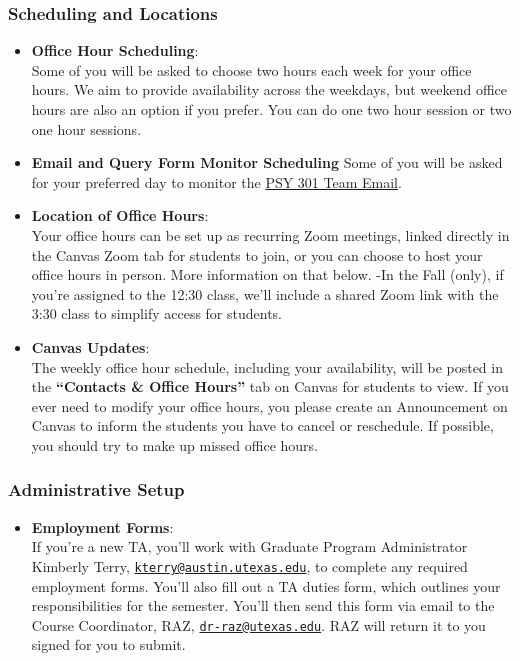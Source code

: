 \documentclass[
]{article}
\providecommand{\tightlist}{%
  \setlength{\itemsep}{0pt}\setlength{\parskip}{0pt}}
\begin{document}
\hypertarget{scheduling-and-locations}{%
\subsubsection{Scheduling and Locations}\label{scheduling-and-locations}}

\begin{itemize}
\item
  \textbf{Office Hour Scheduling}:\\
  Some of you will be asked to choose two hours each week for your office hours. We aim to provide availability across the weekdays, but weekend office hours are also an option if you prefer. You can do one two hour session or two one hour sessions.
\item
  \textbf{Email and Query Form Monitor Scheduling}
  Some of you will be asked for your preferred day to monitor the \protect\hyperlink{emails}{PSY 301 Team Email}.
\item
  \textbf{Location of Office Hours}:\\
  Your office hours can be set up as recurring Zoom meetings, linked directly in the Canvas Zoom tab for students to join, or you can choose to host your office hours in person. More information on that below.
  -In the Fall (only), if you're assigned to the 12:30 class, we'll include a shared Zoom link with the 3:30 class to simplify access for students.
\item
  \textbf{Canvas Updates}:\\
  The weekly office hour schedule, including your availability, will be posted in the \textbf{``Contacts \& Office Hours''} tab on Canvas for students to view. If you ever need to modify your office hours, you please create an Announcement on Canvas to inform the students you have to cancel or reschedule. If possible, you should try to make up missed office hours.
\end{itemize}

\hypertarget{administrative-setup}{%
\subsubsection{Administrative Setup}\label{administrative-setup}}

\begin{itemize}
\tightlist
\item
  \textbf{Employment Forms}:\\
  If you're a new TA, you'll work with Graduate Program Administrator Kimberly Terry, \href{mailto:kterry@austin.utexas.edu}{\nolinkurl{kterry@austin.utexas.edu}}, to complete any required employment forms. You'll also fill out a TA duties form, which outlines your responsibilities for the semester. You'll then send this form via email to the Course Coordinator, RAZ, \href{mailto:dr-raz@utexas.edu}{\nolinkurl{dr-raz@utexas.edu}}. RAZ will return it to you signed for you to submit.
\end{itemize}
\end{document}
